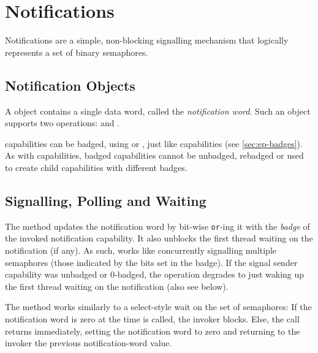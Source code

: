 %
%
%

\chapter{\label{ch:notifications}Notifications}

Notifications are a simple, non-blocking signalling mechanism that
logically represents a set of binary semaphores.

\section{Notification Objects}

A  object contains a single data word, called the
\emph{notification word}. Such an object supports two operations:
 and
.

 capabilities can be badged, using
 or
, just like 
capabilities (see \autoref{sec:ep-badges}). As with 
capabilities, badged  capabilities cannot be
  unbadged, rebadged or used to create child capabilities with
  different badges. \label{s:notif-badge}

\section{Signalling, Polling and Waiting}

The  method updates the
notification word by bit-wise \texttt{or}-ing it with the \emph{badge}
of the invoked notification capability. It also unblocks the first
thread waiting on the notification (if any). As such,
 works like concurrently signalling
multiple semaphores (those indicated by the bits set in the badge).
If the signal sender capability was unbadged or 0-badged, the operation degrades
to just waking up the first thread waiting on the notification (also see below).

The  method works similarly to a
select-style wait on the set of semaphores: If the notification word is
zero at the time  is called, the
invoker blocks. Else, the call returns immediately, setting the
notification word to zero and returning to the invoker the previous
notification-word value.

